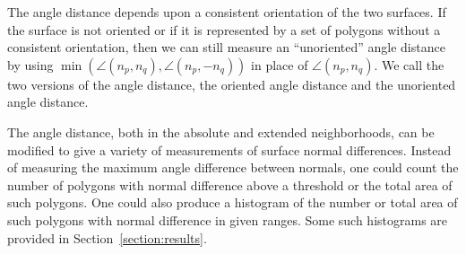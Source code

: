 The angle distance depends upon a consistent orientation of the two surfaces.
If the surface is not oriented or if it is represented by a set
of polygons without a consistent orientation,
then we can still measure an ``unoriented'' angle distance
by using $\min(\angle(n_p,n_q),\angle(n_p,-n_q))$
in place of $\angle(n_p,n_q)$.
We call the two versions of the angle distance,
the oriented angle distance and the unoriented angle distance.

The angle distance, both in the absolute and extended neighborhoods,
can be modified to give a variety of measurements of surface normal differences.
Instead of measuring the maximum angle difference between normals,
one could count the number of polygons with normal difference above
a threshold or the total area of such polygons.
One could also produce a histogram of the number or total area
of such polygons with normal difference in given ranges.
Some such histograms are provided in Section~\ref{section:results}.
